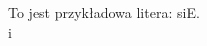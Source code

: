 \documentclass[12pt,polish]{article}
\begin{document}
To jest przykładowa litera: {\mojelitery siE}.\\
{\mojelitery i}
\end{document}
